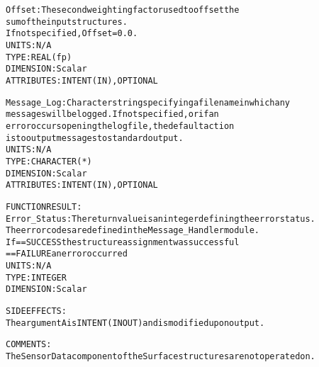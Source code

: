 \begin{alltt}
        Offset:          The second weighting factor used to offset the
                         sum of the input structures.
                         If not specified, Offset = 0.0.
                         UNITS:      N/A
                         TYPE:       REAL(fp)
                         DIMENSION:  Scalar
                         ATTRIBUTES: INTENT(IN), OPTIONAL
 
        Message_Log:     Character string specifying a filename in which any
                         messages will be logged. If not specified, or if an
                         error occurs opening the log file, the default action
                         is to output messages to standard output.
                         UNITS:      N/A
                         TYPE:       CHARACTER(*)
                         DIMENSION:  Scalar
                         ATTRIBUTES: INTENT(IN), OPTIONAL
 
  FUNCTION RESULT:
        Error_Status:    The return value is an integer defining the error status.
                         The error codes are defined in the Message_Handler module.
                         If == SUCCESS the structure assignment was successful
                            == FAILURE an error occurred
                         UNITS:      N/A
                         TYPE:       INTEGER
                         DIMENSION:  Scalar
 
  SIDE EFFECTS:
        The argument A is INTENT(IN OUT) and is modified upon output.
 
  COMMENTS:
        The SensorData component of the Surface structures are not operated on.
 
  \end{alltt}
